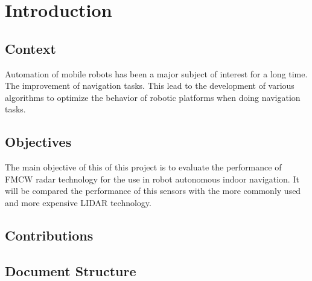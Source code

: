 \chapter{Introduction} \label{ch:introduction}









\section{Context}
Automation of mobile robots has been a major subject of interest for a long time. The improvement of navigation tasks. This lead to the development of various algorithms to optimize the behavior of robotic platforms when doing navigation tasks. 

\section{Objectives}
The main objective of this of this project is to evaluate the performance of \ac{FMCW} radar technology for the use in robot autonomous indoor navigation. It will be compared the performance of this sensors with the more commonly used and more expensive \ac{LIDAR} technology.



\section{Contributions}



\section{Document Structure}

